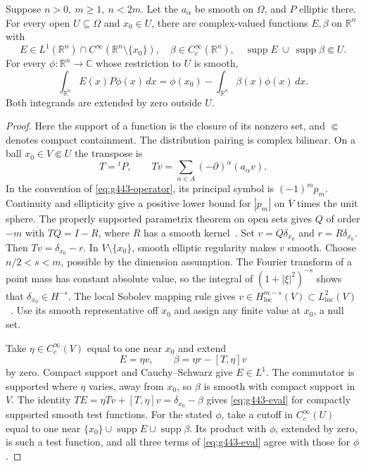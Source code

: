 \begin{proposition}\label{prop:g443-kernel}
Suppose \(n>0,\ m\geq1,\ n<2m\). Let the \(a_\alpha\) be smooth on
\(\Omega\), and \(P\) elliptic there. For every open \(U\subseteq\Omega\)
and \(x_0\in U\), there are complex-valued functions \(E,\beta\) on
\(\mathbb R^n\) with
\[
 E\in L^1(\mathbb R^n)\cap C^\infty(\mathbb R^n\setminus\{x_0\}),\quad
 \beta\in C^\infty_c(\mathbb R^n),\quad
 \operatorname{supp}E\ \cup\ \operatorname{supp}\beta\Subset U .
\]
For every \(\phi:\mathbb R^n\to\mathbb C\) whose restriction to \(U\) is
smooth,
\begin{equation}\label{eq:g443-eval}
 \int_{\mathbb R^n} E(x)P\phi(x)\,dx
       =\phi(x_0)-\int_{\mathbb R^n}\beta(x)\phi(x)\,dx .
\end{equation}
Both integrands are extended by zero outside \(U\).
\end{proposition}
\begin{proof}
Here the support of a function is the closure of its nonzero set, and
\(\Subset\) denotes compact containment.
The distribution pairing is complex bilinear. On a ball
\(x_0\in V\Subset U\) the transpose is
\[
 T={}^tP,\qquad Tv=\sum_{\alpha\in A}(-\partial)^\alpha(a_\alpha v).
\]
In the convention of \eqref{eq:g443-operator}, its principal symbol is
\((-1)^mp_m\). Continuity and ellipticity give a positive lower bound for
\(|p_m|\) on \(\overline V\) times the unit sphere. The properly supported parametrix theorem
on open sets gives \(Q\) of order \(-m\) with \(TQ=I-R\), where \(R\)
has a smooth kernel~\cite[Cor.~7.19]{g443-grubb}. Set
\(v=Q\delta_{x_0}\) and \(r=R\delta_{x_0}\). Then \(Tv=\delta_{x_0}-r\).
In \(V\setminus\{x_0\}\), smooth elliptic regularity makes \(v\) smooth.
Choose \(n/2<s<m\), possible by the dimension assumption. The Fourier
transform of a point mass has constant absolute value, so the integral of
\((1+|\xi|^2)^{-s}\) shows that \(\delta_{x_0}\in H^{-s}\). The local
Sobolev mapping rule gives \(v\in H_{\mathrm{loc}}^{m-s}(V)\subset
L^2_{\mathrm{loc}}(V)\)~\cite[\S7.4, proof of Cor.~7.20]{g443-grubb}.
Use its smooth representative off \(x_0\) and assign any finite value at
\(x_0\), a null set.

Take \(\eta\in C^\infty_c(V)\) equal to one near \(x_0\) and extend
\[
        E=\eta v,\qquad \beta=\eta r-[T,\eta]v
\]
by zero. Compact support and Cauchy--Schwarz give \(E\in L^1\).
The commutator is supported where \(\eta\) varies, away from \(x_0\),
so \(\beta\) is smooth with compact support in \(V\).
The identity \(TE=\eta Tv+[T,\eta]v=\delta_{x_0}-\beta\) gives
\eqref{eq:g443-eval} for compactly supported smooth test functions.
For the stated \(\phi\), take a cutoff in \(C^\infty_c(U)\) equal to one
near \(\{x_0\}\cup\operatorname{supp}E\cup\operatorname{supp}\beta\).
Its product with \(\phi\), extended by zero, is such a test function, and
all three terms of \eqref{eq:g443-eval} agree with those for \(\phi\).
\end{proof}

